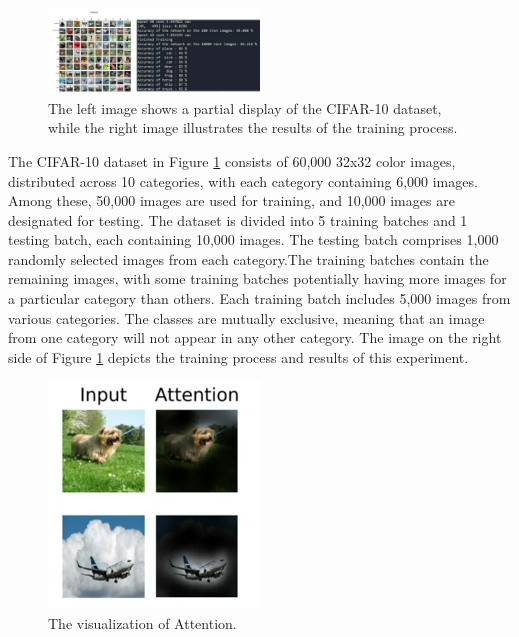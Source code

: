 \documentclass[10pt,twocolumn,letterpaper]{article}
\begin{document}
\begin{figure}
  \centering %
  \includegraphics[width=0.5\textwidth]{image9.png} %
  \caption{The left image shows a partial display of the CIFAR-10 dataset, while the right image illustrates the results of the training process.} %
  \label{fig9}
\end{figure}

The CIFAR-10 dataset in Figure \ref{fig9} consists of 60,000 32x32 color images, distributed across 10 categories, with each category containing 6,000 images. Among these, 50,000 images are used for training, and 10,000 images are designated for testing. The dataset is divided into 5 training batches and 1 testing batch, each containing 10,000 images. The testing batch comprises 1,000 randomly selected images from each category.The training batches contain the remaining images, with some training batches potentially having more images for a particular category than others. Each training batch includes 5,000 images from various categories. The classes are mutually exclusive, meaning that an image from one category will not appear in any other category.
The image on the right side of Figure \ref{fig9} depicts the training process and results of this experiment.
\begin{figure}
  \centering %
  \includegraphics[width=0.5\textwidth]{image10.png} %
  \caption{The visualization of Attention.} %
  \label{fig10}
\end{figure}
\end{document}
